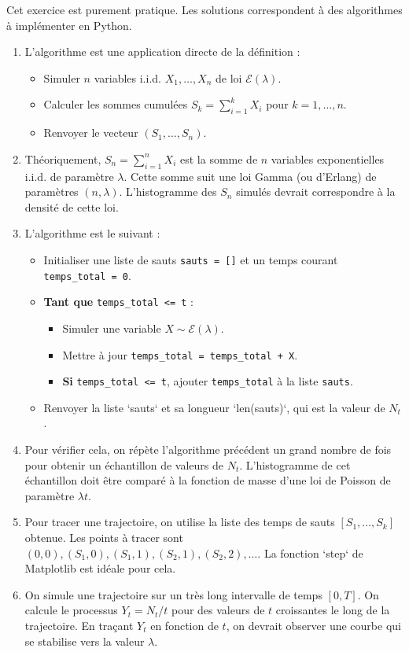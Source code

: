 \documentclass[solutions]{exercices}
\begin{document}
\begin{solution}
Cet exercice est purement pratique. Les solutions correspondent à des algorithmes à implémenter en Python.
\begin{enumerate}
    \item L'algorithme est une application directe de la définition :
    \begin{itemize}
        \item Simuler $n$ variables i.i.d. $X_1, \dots, X_n$ de loi $\mathcal{E}(\lambda)$.
        \item Calculer les sommes cumulées $S_k = \sum_{i=1}^k X_i$ pour $k=1, \dots, n$.
        \item Renvoyer le vecteur $(S_1, \dots, S_n)$.
    \end{itemize}
    \item Théoriquement, $S_n = \sum_{i=1}^n X_i$ est la somme de $n$ variables exponentielles i.i.d. de paramètre $\lambda$. Cette somme suit une loi Gamma (ou d'Erlang) de paramètres $(n, \lambda)$. L'histogramme des $S_n$ simulés devrait correspondre à la densité de cette loi.
    \item L'algorithme est le suivant :
	\begin{itemize}
		\item Initialiser une liste de sauts \texttt{sauts = []} et un temps courant \texttt{temps\_total = 0}.
		\item \textbf{Tant que} \texttt{temps\_total <= t} :
        \begin{itemize}
            \item Simuler une variable $X \sim \mathcal{E}(\lambda)$.
			\item Mettre à jour \texttt{temps\_total = temps\_total + X}.
			\item \textbf{Si} \texttt{temps\_total <= t}, ajouter \texttt{temps\_total} à la liste \texttt{sauts}.
        \end{itemize}
        \item Renvoyer la liste `sauts` et sa longueur `len(sauts)`, qui est la valeur de $N_t$.
    \end{itemize}
    \item Pour vérifier cela, on répète l'algorithme précédent un grand nombre de fois pour obtenir un échantillon de valeurs de $N_t$. L'histogramme de cet échantillon doit être comparé à la fonction de masse d'une loi de Poisson de paramètre $\lambda t$.
    \item Pour tracer une trajectoire, on utilise la liste des temps de sauts $[S_1, \dots, S_k]$ obtenue. Les points à tracer sont $(0,0), (S_1,0), (S_1,1), (S_2,1), (S_2,2), \dots$. La fonction `step` de Matplotlib est idéale pour cela.
    \item On simule une trajectoire sur un très long intervalle de temps $[0, T]$. On calcule le processus $Y_t = N_t / t$ pour des valeurs de $t$ croissantes le long de la trajectoire. En traçant $Y_t$ en fonction de $t$, on devrait observer une courbe qui se stabilise vers la valeur $\lambda$.
\end{enumerate}
\end{solution}
\end{document}
